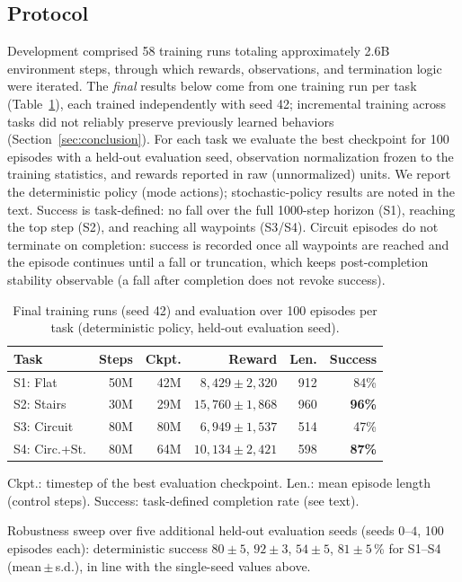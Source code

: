 \documentclass[conference,a4paper]{IEEEtran}
\begin{document}
\subsection{Protocol}
Development comprised 58 training runs totaling approximately 2.6B environment steps, through which rewards, observations, and termination logic were iterated. The \emph{final} results below come from one training run per task (Table~\ref{tab:final_runs}), each trained independently with seed 42; incremental training across tasks did not reliably preserve previously learned behaviors (Section~\ref{sec:conclusion}). For each task we evaluate the best checkpoint for 100 episodes with a held-out evaluation seed, observation normalization frozen to the training statistics, and rewards reported in raw (unnormalized) units. We report the deterministic policy (mode actions); stochastic-policy results are noted in the text. Success is task-defined: no fall over the full 1000-step horizon (S1), reaching the top step (S2), and reaching all waypoints (S3/S4). Circuit episodes do not terminate on completion: success is recorded once all waypoints are reached and the episode continues until a fall or truncation, which keeps post-completion stability observable (a fall after completion does not revoke success).

\begin{table}[t]
\centering
\caption{Final training runs (seed 42) and evaluation over 100 episodes per task (deterministic policy, held-out evaluation seed).}
\label{tab:final_runs}
\footnotesize
\setlength{\tabcolsep}{4pt}
\begin{threeparttable}
\begin{tabular}{@{}lrrrrr@{}}
\toprule
\textbf{Task} & \textbf{Steps} & \textbf{Ckpt.} & \textbf{Reward} & \textbf{Len.} & \textbf{Success}\tnote{a} \\
\midrule
S1: Flat & 50M & 42M & $8{,}429 \pm 2{,}320$ & 912 & 84\% \\
S2: Stairs & 30M & 29M & $15{,}760 \pm 1{,}868$ & 960 & \textbf{96\%} \\
S3: Circuit & 80M & 80M & $6{,}949 \pm 1{,}537$ & 514 & 47\% \\
S4: Circ.+St. & 80M & 64M & $10{,}134 \pm 2{,}421$ & 598 & \textbf{87\%} \\
\bottomrule
\end{tabular}
\begin{tablenotes}[flushleft]
\footnotesize
\item Ckpt.: timestep of the best evaluation checkpoint. Len.: mean episode length (control steps). Success: task-defined completion rate (see text).
\item[a] Robustness sweep over five additional held-out evaluation seeds (seeds $0$--$4$, 100 episodes each): deterministic success $80\pm5$, $92\pm3$, $54\pm5$, $81\pm5$\,\% for S1--S4 (mean\,$\pm$\,s.d.), in line with the single-seed values above.
\end{tablenotes}
\end{threeparttable}
\end{table}
\end{document}
